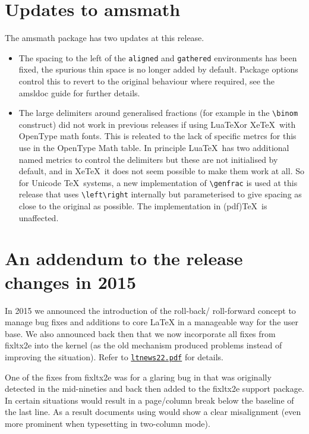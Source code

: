 \documentclass{ltnews}
\begin{document}
\section{Updates to \textsf{amsmath}}
The \textsf{amsmath} package has two updates at this release.
\begin{itemize}
\item The spacing to the left of the \texttt{aligned} and
  \texttt{gathered} environments has been fixed, the spurious thin
  space is no longer added by default. Package options control this
  to revert to the original behaviour where required, see the
  \textsf{amsldoc} guide for further details. 
\item The large delimiters around generalised fractions (for example
  in the \verb|\binom| construct) did not work in previous releases if
  using Lua\TeX or Xe\TeX\ with OpenType math fonts. This is releated
  to the lack of specific metrcs for this use in the OpenType Math
  table. In principle Lua\TeX\ has two additional named metrics
  to control the delimiters but these are not initialised by default,
  and in Xe\TeX\ it does not seem possible to make them work at all.
  So for Unicode \TeX\ systems, a new implementation of
  \verb|\genfrac| is used at this release that uses \verb|\left\right|
  internally but parameterised to give spacing as close to the
  original as possible. The implementation in (pdf)\TeX\ is
  unaffected.
\end{itemize}

\section{An addendum to the release changes in 2015}

In 2015 we announced the introduction of the roll-back\slash
roll-forward concept to manage bug fixes and additions to core
\LaTeX{} in a manageable way for the user base. We also announced back
then that we now incorporate all fixes from \textsf{fixltx2e} into the
kernel (as the old mechanism produced problems instead of improving
the situation). Refer to
\href{https://www.latex-project.org/news/latex2e-news/ltnews22.pdf}{\texttt{ltnews22.pdf}}
for details.

One of the fixes from \textsf{fixltx2e} was for a glaring bug in
 that was originally detected in the mid-nineties and
back then added to the \textsf{fixltx2e} support package. In certain
situations  would result in a page/column break below
the baseline of the last line. As a result documents using
 would show a clear misalignment (even more prominent
when typesetting in two-column mode).
\end{document}
